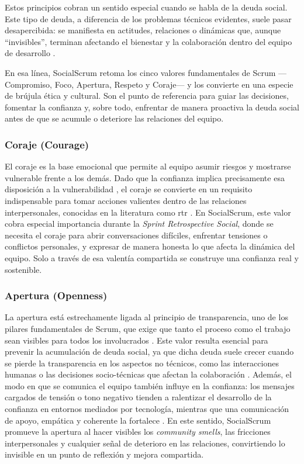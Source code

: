Estos principios cobran un sentido especial cuando se habla de la deuda social. Este tipo de deuda, a diferencia de los problemas técnicos evidentes, suele pasar desapercibida: se manifiesta en actitudes, relaciones o dinámicas que, aunque ``invisibles'', terminan afectando el bienestar y la colaboración dentro del equipo de desarrollo \cite{saeeda2024nontechnicaldebt,caballero2022communitysmells}.

En esa línea, SocialScrum retoma los cinco valores fundamentales de Scrum —Compromiso, Foco, Apertura, Respeto y Coraje— \cite{schwaber2020scrum} y los convierte en una especie de brújula ética y cultural. Son el punto de referencia para guiar las decisiones, fomentar la confianza y, sobre todo, enfrentar de manera proactiva la deuda social antes de que se acumule o deteriore las relaciones del equipo.

\subsubsection{Coraje (Courage)}
El coraje es la base emocional que permite al equipo asumir riesgos y mostrarse vulnerable frente a los demás.
Dado que la confianza implica precisamente esa disposición a la vulnerabilidad \cite{mayer_integrative_1995}, el coraje se convierte en un requisito indispensable para tomar acciones valientes dentro de las relaciones interpersonales, conocidas en la literatura como \gls{rtr} \cite{mayer_integrative_1995}.
En SocialScrum, este valor cobra especial importancia durante la \textit{Sprint Retrospective Social}, donde se necesita el coraje para abrir conversaciones difíciles, enfrentar tensiones o conflictos personales, y expresar de manera honesta lo que afecta la dinámica del equipo. Solo a través de esa valentía compartida se construye una confianza real y sostenible.

\subsubsection{Apertura (Openness)}
La apertura está estrechamente ligada al principio de transparencia, uno de los pilares fundamentales de Scrum, que exige que tanto el proceso como el trabajo sean visibles para todos los involucrados \cite{wilson_all_2006,schwaber2020scrum}.
Este valor resulta esencial para prevenir la acumulación de deuda social, ya que dicha deuda suele crecer cuando se pierde la transparencia en los aspectos no técnicos, como las interacciones humanas o las decisiones socio-técnicas que afectan la colaboración \cite{schwaber2020scrum,tamburri2013socialdebt}.
Además, el modo en que se comunica el equipo también influye en la confianza: los mensajes cargados de tensión o tono negativo tienden a ralentizar el desarrollo de la confianza en entornos mediados por tecnología, mientras que una comunicación de apoyo, empática y coherente la fortalece \cite{wilson_all_2006}.
En este sentido, SocialScrum promueve la apertura al hacer visibles los \textit{community smells}, las fricciones interpersonales y cualquier señal de deterioro en las relaciones, convirtiendo lo invisible en un punto de reflexión y mejora compartida.


